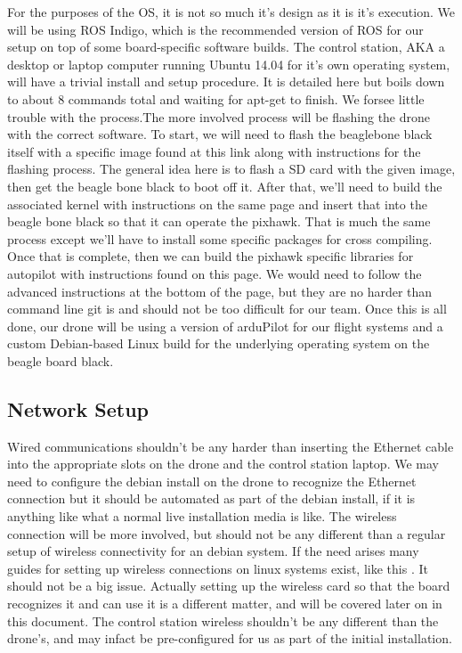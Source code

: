 \documentclass[IEEEtran,letterpaper,10pt,titlepage,draftclsnofoot,onecolumn]{article}
\begin{document}
For the purposes of the OS, it is not so much it's design as it is it's execution.
We will be using ROS Indigo, which is the recommended version of ROS for our setup on top of some board-specific software 
builds. The control station, AKA a desktop or laptop computer running Ubuntu 14.04 for it's own operating system, will have a 
trivial install and setup procedure. It is detailed here\cite{Indigo} but boils down to about 8 commands total and waiting for 
apt-get to finish. We forsee little trouble with the process.The more involved process will be flashing the drone with the 
correct software. To start, we will need to flash the beaglebone black itself with a specific image found at this link along 
with instructions for the flashing process\cite{buildingBBB}. The general idea here is to flash a SD card with the given image, 
then get the beagle bone black to boot off it. After that, we'll need to build the associated kernel with instructions on the 
same page and insert that into the beagle bone black so that it can operate the pixhawk. That is much the same process except 
we'll have to install some specific packages for cross compiling. Once that is complete, then we can build the pixhawk specific 
libraries for autopilot with instructions found on this page\cite{buildingPX}. We would need to follow the advanced 
instructions at the bottom of the page, but they are no harder than command line git is and should not be too difficult for our 
team. Once this is all done, our drone will be using a version of arduPilot for our flight systems and a custom Debian-based 
Linux build for the underlying operating system on the beagle board black.

\subsection*{Network Setup}

Wired communications shouldn't be any harder than inserting the Ethernet cable into the appropriate slots on the drone and the 
control station laptop. We may need to configure the debian install on the drone to recognize the Ethernet connection but it 
should be automated as part of the debian install, if it is anything like what a normal live installation media is like.
The wireless connection will be more involved, but should not be any different than a regular setup of wireless connectivity
for an debian system. If the need arises many guides for setting up wireless connections on linux systems exist, like this
\cite{wirelessconfig}. It should not be a big issue. Actually setting up the wireless card so that the board recognizes it and 
can use it is a different matter, and will be covered later on in this document. The control station wireless shouldn't be 
any different than the drone's, and may infact be pre-configured for us as part of the initial installation.
\end{document}
